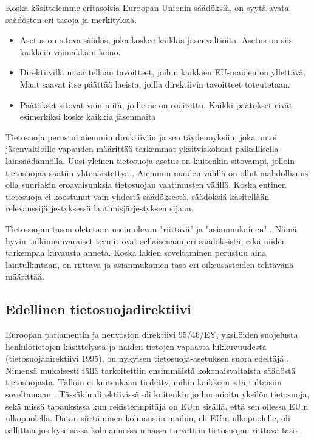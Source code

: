 \documentclass[finnish]{tktltiki}
\begin{document}
Koska käsittelemme eritasoisia Euroopan Unionin säädöksiä, on syytä avata säädösten eri tasoja ja merkityksiä.
\begin{itemize}
\item Asetus on sitova säädös, joka koskee kaikkia jäsenvaltioita. Asetus on siis kaikkein voimakkain keino. \cite{europa}
\item Direktiivillä määritellään tavoitteet, joihin kaikkien EU-maiden on yllettävä. Maat saavat itse päättää laeista, joilla direktiivin tavoitteet toteutetaan. \cite{europa}
\item Päätökset sitovat vain niitä, joille ne on osoitettu. Kaikki päätökset eivät esimerkiksi koske kaikkia jäsenmaita \cite{europa}
\end{itemize}
Tietosuoja perustui aiemmin direktiiviin ja sen täydennyksiin, joka antoi jäsenvaltioille vapauden määrittää tarkemmat yksityiskohdat paikallisella lainsäädännöllä. Uusi yleinen tietosuoja-asetus on kuitenkin sitovampi, jolloin tietosuojaa saatiin yhtenäistettyä \cite{eu2016,europa}. Aiemmin maiden välillä on ollut mahdollisuus olla suuriakin eroavaisuuksia tietosuojan vaatimusten välillä. Koska entinen tietosuoja ei koostunut vain yhdestä säädöksestä, säädöksiä käsitellään relevanssijärjestyksessä laatimisjärjestyksen sijaan.

Tietosuojan tason oletetaan usein olevan "riittävä" ja "asianmukainen" \cite{eu95,eu2016}. Nämä hyvin tulkinnanvaraiset termit ovat sellaisenaan eri säädöksistä, eikä niiden tarkempaa kuvausta anneta. Koska lakien soveltaminen perustuu aina laintulkintaan, on riittävä ja asianmukainen taso eri oikeusasteiden tehtävänä määrittää. 

\subsection{Edellinen tietosuojadirektiivi}

Euroopan parlamentin ja neuvoston direktiivi 95/46/EY, yksilöiden suojelusta henkilötietojen käsittelyssä ja näiden tietojen vapaasta liikkuvuudesta (tietosuojadirektiivi 1995), on nykyisen tietosuoja-asetuksen suora edeltäjä \cite{eu95,eu2016}. Nimensä mukaisesti tällä tarkoitettiin ensimmäistä kokonaisvaltaista säädöstä tietosuojasta. Tällöin ei kuitenkaan tiedetty, mihin kaikkeen sitä tultaisiin soveltamaan \cite{eu2016}. Tässäkin direktiivissä oli kuitenkin jo huomioitu yksilön tietosuoja, sekä niissä tapauksissa kun rekisterinpitäjä on EU:n sisällä, että sen ollessa EU:n ulkopuolella. Datan siirtäminen kolmansiin maihin, eli EU:n ulkopuolelle, oli sallittua jos kyseisessä kolmannessa maassa turvattiin tietosuojan riittävä taso \cite{eu95,safeharbor}.
\end{document}
